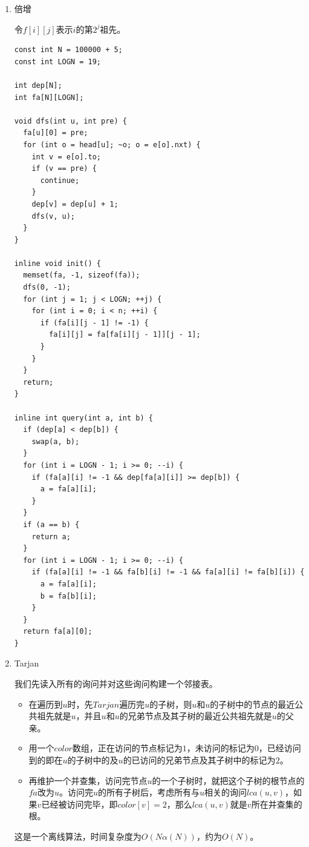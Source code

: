 \documentclass[11pt]{article}
\begin{document}
\begin{enumerate}
\item 倍增
\label{sec-2-2-2-1}

令\(f[i][j]\)表示\(i\)的第\(2^j\)祖先。

\begin{verbatim}
const int N = 100000 + 5;
const int LOGN = 19;

int dep[N];
int fa[N][LOGN];

void dfs(int u, int pre) {
  fa[u][0] = pre;
  for (int o = head[u]; ~o; o = e[o].nxt) {
    int v = e[o].to;
    if (v == pre) {
      continue;
    }
    dep[v] = dep[u] + 1;
    dfs(v, u);
  }
}

inline void init() {
  memset(fa, -1, sizeof(fa));
  dfs(0, -1);
  for (int j = 1; j < LOGN; ++j) {
    for (int i = 0; i < n; ++i) {
      if (fa[i][j - 1] != -1) {
        fa[i][j] = fa[fa[i][j - 1]][j - 1];
      }
    }
  }
  return;
}

inline int query(int a, int b) {
  if (dep[a] < dep[b]) {
    swap(a, b);
  }
  for (int i = LOGN - 1; i >= 0; --i) {
    if (fa[a][i] != -1 && dep[fa[a][i]] >= dep[b]) {
      a = fa[a][i];
    }
  }
  if (a == b) {
    return a;
  }
  for (int i = LOGN - 1; i >= 0; --i) {
    if (fa[a][i] != -1 && fa[b][i] != -1 && fa[a][i] != fa[b][i]) {
      a = fa[a][i];
      b = fa[b][i];
    }
  }
  return fa[a][0];
}
\end{verbatim}
\item Tarjan
\label{sec-2-2-2-2}

我们先读入所有的询问并对这些询问构建一个邻接表。

\begin{itemize}
\item 在遍历到\(u\)时，先\(Tarjan\)遍历完\(u\)的子树，则\(u\)和\(u\)的子树中的节点的最近公共祖先就是\(u\)，并且\(u\)和\(u\)的兄弟节点及其子树的最近公共祖先就是\(u\)的父亲。
\item 用一个\(color\)数组，正在访问的节点标记为\(1\)，未访问的标记为\(0\)，已经访问到的即在\(u\)的子树中的及\(u\)的已访问的兄弟节点及其子树中的标记为\(2\)。
\item 再维护一个并查集，访问完节点\(u\)的⼀个子树时，就把这个子树的根节点的\(fa\)改为\(u\)。访问完\(u\)的所有子树后，考虑所有与\(u\)相关的询问\(lca(u,v)\)，如果\(v\)已经被访问完毕，即\(color[v] = 2\)，那么\(lca(u,v)\)就是\(v\)所在并查集的根。
\end{itemize}

这是一个离线算法，时间复杂度为\(O(N\alpha(N))\)，约为\(O(N)\)。


\end{enumerate}
\end{document}
